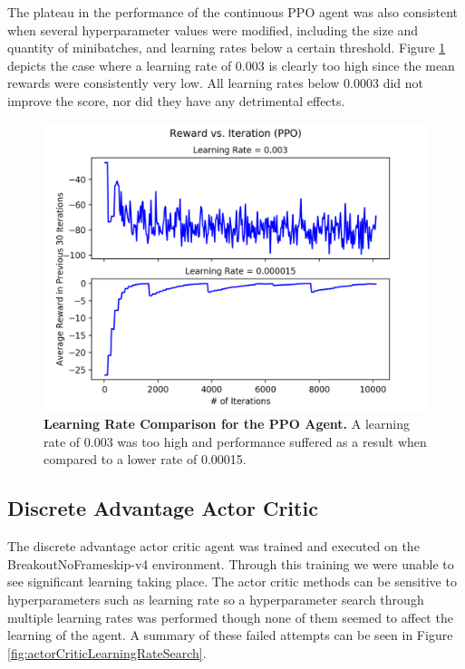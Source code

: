 \documentclass[conference]{IEEEtran}
\begin{document}
The plateau in the performance of the continuous PPO agent was also consistent when several hyperparameter values were modified, including the size and quantity of minibatches, and learning rates below a certain threshold. Figure \ref{fig:PPOLRComparedMCC} depicts the case where a learning rate of 0.003 is clearly too high since the mean rewards were consistently very low. All learning rates below 0.0003 did not improve the score, nor did they have any detrimental effects.

\begin{figure}[htbp]
\centerline{\includegraphics[scale=0.5]{PPO_Train_Reward_Plot_MCC_LRCompare.png}}
\caption{\textbf{Learning Rate Comparison for the PPO Agent.}  A learning rate of 0.003 was too high and performance suffered as a result when compared to a lower rate of 0.00015.}
\label{fig:PPOLRComparedMCC}
\end{figure}

\subsection{Discrete Advantage Actor Critic}
The discrete advantage actor critic agent was trained and executed on the BreakoutNoFrameskip-v4 environment.
Through this training we were unable to see significant learning taking place.
The actor critic methods can be sensitive to hyperparameters such as learning rate so a hyperparameter search through multiple learning rates was performed though none of them seemed to affect the learning of the agent.
A summary of these failed attempts can be seen in Figure \ref{fig:actorCriticLearningRateSearch}.
\end{document}
